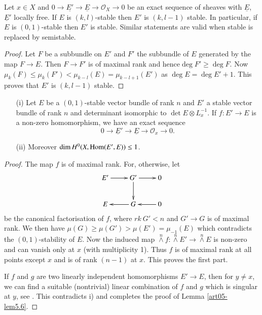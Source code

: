 \begin{lemma}\label{art05-lem5.5}
Let $x\in X$ and
$0\to \underline{E'}\to \underline{E}\to \mathscr{O}_{X}\to 0$ be an
exact sequence of sheaves with $\underline{E}$, $\underline{E}'$
locally free. If $E$ is $(k,l)$-stable then $E'$ is $(k,l-1)$
stable. In particular, if $E$ is $(0,1)$-stable then $E'$ is
stable. Similar statements are valid when stable is replaced by
semistable. 
\end{lemma}

\begin{proof}
Let $F$ be a subbundle on $E'$ and $F'$ the subbundle of $E$ generated
by the map $F\to E$. Then $F\to F'$ is of maximal rank and
hence\pageoriginale $\deg F'\geq \deg F$. Now
$\mu_{k}(F)\leq \mu_{k}(F')<\mu_{k-l}(E)=\mu_{k-l+1}(E')$ as $\deg
E=\deg E'+1$. This proves that $E'$ is $(k,l-1)$ stable.
\end{proof}

\begin{lemma}\label{art05-lem5.6}
\begin{itemize}
\item[\rm(i)] Let $E$ be a $(0,1)$-stable vector bundle of rank $n$
and $E'$ a stable vector bundle of rank $n$ and determinant isomorphic
to $\det E\otimes L^{-1}_{x}$. If $f:E'\to E$ is a non-zero
homomorphism, we have an exact sequence
$$
0\to \underline{E}'\to \underline{E}\to \mathscr{O}_{x}\to 0.
$$

\item[\rm(ii)] Moreover $\dim H^{0}(X,\operatorname{Hom}(E',E))\leq 1$.
\end{itemize}
\end{lemma}

\begin{proof}
The map $f$ is of maximal rank. For, otherwise, let
\[
\xymatrix{
E'\ar[r] & G'\ar[d]\ar[r] & 0\\
E & G\ar[l] & 0\ar[l]
}
\]
be the canonical factorisation of $f$, where $rk\ G'<n$ and $G'\to G$
is of maximal rank. We then have
$\mu(G)\geq \mu(G')>\mu(E')=\mu_{-1}(E)$ which contradicts the
$(0,1)$-stability of $E$. Now the induced map
$\overset{n}{\wedge}f:\overset{n}{\wedge}E'\to \overset{n}{\wedge}E$
is non-zero and can vanish only at $x$ (with multiplicity 1). Thus $f$
is of maximal rank at all points except $x$ and is of rank $(n-1)$ at
$x$. This proves the first part.

If $f$ and $g$ are two linearly independent homomorphisms $E'\to E$,
then for $y\neq x$, we can find a suitable (nontrivial) linear
combination of $f$ and $g$ which is singular at $y$, see \cite[Lemma
7.1]{art05-key4}. This contradicts i) and completes the proof of
Lemma \ref{art05-lem5.6}. 
\end{proof}

